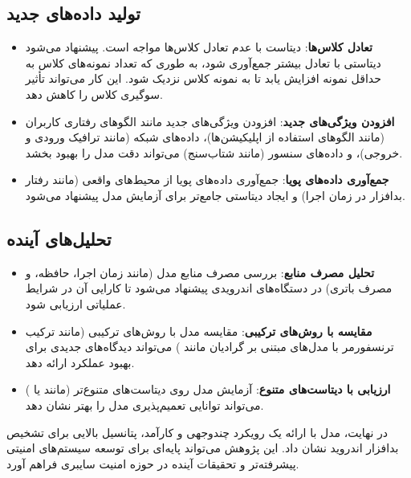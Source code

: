 \subsection{تولید داده‌های جدید}
\begin{itemize}
    \renewcommand{\labelitemi}{\lr{$\bullet$}}
    \item \textbf{تعادل کلاس‌ها}: دیتاست  با عدم تعادل کلاس‌ها مواجه است. پیشنهاد می‌شود دیتاستی با تعادل بیشتر جمع‌آوری شود، به طوری که تعداد نمونه‌های کلاس  به حداقل  نمونه افزایش یابد تا به  نمونه کلاس  نزدیک شود. این کار می‌تواند تأثیر سوگیری کلاس را کاهش دهد.
    \item \textbf{افزودن ویژگی‌های جدید}: افزودن ویژگی‌های جدید مانند الگوهای رفتاری کاربران (مانند الگوهای استفاده از اپلیکیشن‌ها)، داده‌های شبکه (مانند ترافیک ورودی و خروجی)، و داده‌های سنسور (مانند شتاب‌سنج) می‌تواند دقت مدل را بهبود بخشد.
    \item \textbf{جمع‌آوری داده‌های پویا}: جمع‌آوری داده‌های پویا از محیط‌های واقعی (مانند رفتار بدافزار در زمان اجرا) و ایجاد دیتاستی جامع‌تر برای آزمایش مدل  پیشنهاد می‌شود.
\end{itemize}

\subsection{تحلیل‌های آینده}
\begin{itemize}
    \renewcommand{\labelitemi}{\lr{$\bullet$}}
    \item \textbf{تحلیل مصرف منابع}: بررسی مصرف منابع مدل  (مانند زمان اجرا، حافظه، و مصرف باتری) در دستگاه‌های اندرویدی پیشنهاد می‌شود تا کارایی آن در شرایط عملیاتی ارزیابی شود.
    \item \textbf{مقایسه با روش‌های ترکیبی}: مقایسه مدل  با روش‌های ترکیبی (مانند ترکیب ترنسفورمر با مدل‌های مبتنی بر گرادیان مانند ) می‌تواند دیدگاه‌های جدیدی برای بهبود عملکرد ارائه دهد.
    \item \textbf{ارزیابی با دیتاست‌های متنوع}: آزمایش مدل روی دیتاست‌های متنوع‌تر (مانند  \cite{CICMalDroid} یا  ) می‌تواند توانایی تعمیم‌پذیری مدل را بهتر نشان دهد.
\end{itemize}

در نهایت، مدل  با ارائه یک رویکرد چندوجهی و کارآمد، پتانسیل بالایی برای تشخیص بدافزار اندروید نشان داد. این پژوهش می‌تواند پایه‌ای برای توسعه سیستم‌های امنیتی پیشرفته‌تر و تحقیقات آینده در حوزه امنیت سایبری فراهم آورد.
